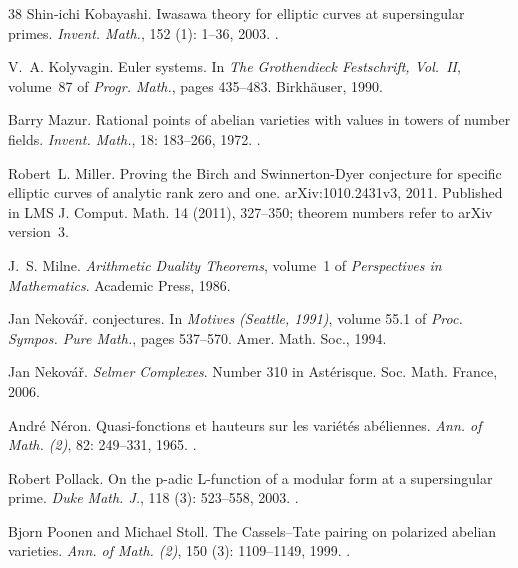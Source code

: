 \documentclass[11pt]{article}
\theoremstyle{definition}
\begin{document}
\begin{thebibliography}{38}
Shin-ichi Kobayashi.
\newblock Iwasawa theory for elliptic curves at supersingular primes.
\newblock \emph{Invent. Math.}, 152 (1): 1--36, 2003.
\newblock {}.

V.~A. Kolyvagin.
\newblock Euler systems.
\newblock In \emph{The {Grothendieck} {Festschrift}, Vol.~II}, volume~87 of \emph{Progr. Math.}, pages 435--483. Birkh\"auser, 1990.

Barry Mazur.
\newblock Rational points of abelian varieties with values in towers of number fields.
\newblock \emph{Invent. Math.}, 18: 183--266, 1972.
\newblock {}.

Robert~L. Miller.
\newblock Proving the {Birch} and {Swinnerton-Dyer} conjecture for specific elliptic curves of analytic rank zero and one.
\newblock arXiv:1010.2431v3, 2011.
\newblock Published in LMS J. Comput. Math. 14 (2011), 327--350; theorem numbers refer to arXiv version~3.

J.~S. Milne.
\newblock \emph{Arithmetic Duality Theorems}, volume~1 of \emph{Perspectives in Mathematics}.
\newblock Academic Press, 1986.

Jan Nekov\'a\v{r}.
 conjectures.
\newblock In \emph{Motives ({Seattle}, 1991)}, volume 55.1 of \emph{Proc. Sympos. Pure Math.}, pages 537--570. Amer. Math. Soc., 1994.

Jan Nekov\'a\v{r}.
\newblock \emph{Selmer Complexes}.
\newblock Number 310 in Ast\'erisque. Soc. Math. France, 2006.

Andr\'e N\'eron.
\newblock Quasi-fonctions et hauteurs sur les vari\'et\'es ab\'eliennes.
\newblock \emph{Ann. of Math. (2)}, 82: 249--331, 1965.
\newblock {}.

Robert Pollack.
\newblock On the p-adic {L}-function of a modular form at a supersingular prime.
\newblock \emph{Duke Math. J.}, 118 (3): 523--558, 2003.
\newblock {}.

Bjorn Poonen and Michael Stoll.
\newblock The {Cassels--Tate} pairing on polarized abelian varieties.
\newblock \emph{Ann. of Math. (2)}, 150 (3): 1109--1149, 1999.
\newblock {}.


\end{thebibliography}
\end{document}
